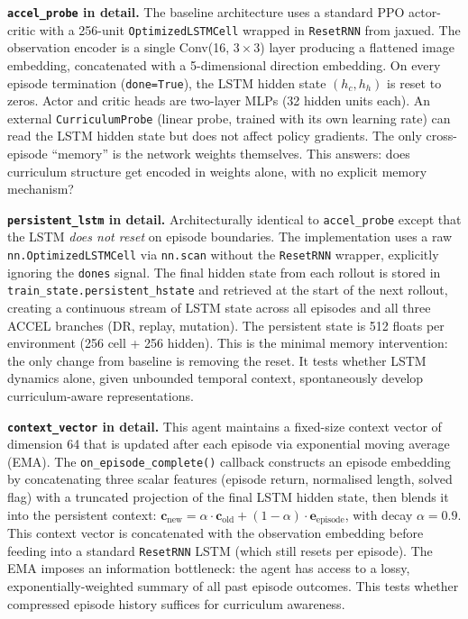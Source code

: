 \documentclass[11pt,a4paper]{article}
\theoremstyle{remark}
\begin{document}
\textbf{\texttt{accel\_probe} in detail.} The baseline architecture uses a standard PPO actor-critic with a 256-unit \texttt{OptimizedLSTMCell} wrapped in \texttt{ResetRNN} from jaxued. The observation encoder is a single Conv(16, $3 \times 3$) layer producing a flattened image embedding, concatenated with a 5-dimensional direction embedding. On every episode termination (\texttt{done=True}), the LSTM hidden state $(h_c, h_h)$ is reset to zeros. Actor and critic heads are two-layer MLPs (32 hidden units each). An external \texttt{CurriculumProbe} (linear probe, trained with its own learning rate) can read the LSTM hidden state but does not affect policy gradients. The only cross-episode ``memory'' is the network weights themselves. This answers: does curriculum structure get encoded in weights alone, with no explicit memory mechanism?

\textbf{\texttt{persistent\_lstm} in detail.} Architecturally identical to \texttt{accel\_probe} except that the LSTM \textit{does not reset} on episode boundaries. The implementation uses a raw \texttt{nn.OptimizedLSTMCell} via \texttt{nn.scan} without the \texttt{ResetRNN} wrapper, explicitly ignoring the \texttt{dones} signal. The final hidden state from each rollout is stored in \texttt{train\_state.persistent\_hstate} and retrieved at the start of the next rollout, creating a continuous stream of LSTM state across all episodes and all three ACCEL branches (DR, replay, mutation). The persistent state is 512 floats per environment (256 cell + 256 hidden). This is the minimal memory intervention: the only change from baseline is removing the reset. It tests whether LSTM dynamics alone, given unbounded temporal context, spontaneously develop curriculum-aware representations.

\textbf{\texttt{context\_vector} in detail.} This agent maintains a fixed-size context vector of dimension 64 that is updated after each episode via exponential moving average (EMA). The \texttt{on\_episode\_complete()} callback constructs an episode embedding by concatenating three scalar features (episode return, normalised length, solved flag) with a truncated projection of the final LSTM hidden state, then blends it into the persistent context: $\mathbf{c}_{\text{new}} = \alpha \cdot \mathbf{c}_{\text{old}} + (1 - \alpha) \cdot \mathbf{e}_{\text{episode}}$, with decay $\alpha = 0.9$. This context vector is concatenated with the observation embedding before feeding into a standard \texttt{ResetRNN} LSTM (which still resets per episode). The EMA imposes an information bottleneck: the agent has access to a lossy, exponentially-weighted summary of all past episode outcomes. This tests whether compressed episode history suffices for curriculum awareness.
\end{document}
